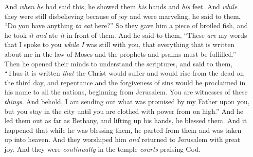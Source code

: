 \begin{biblechapter}
\verse And \textit{when he} had said this, he showed them \textit{his} hands and \textit{his} feet.
\verse And \textit{while} they were still disbelieving because of joy and were marveling, he said to them, “Do you have anything \textit{to eat} here?”
\verse So they gave him a piece of broiled fish,
\verse and he took \textit{it} \textit{and} ate \textit{it} in front of them.
 And he said to them, “These \textit{are} my words that I spoke to you \textit{while I} was still with you, that everything that is written about me in the law of Moses and the prophets and psalms must be fulfilled.”
\verse Then he opened their minds to understand the scriptures,
\verse and said to them, “Thus it is written \textit{that} the Christ would suffer and would rise from the dead on the third day,
\verse and repentance and the forgiveness of sins would be proclaimed in his name to all the nations, beginning from Jerusalem.
\verse You are witnesses of these \textit{things}.
\verse And behold, I am sending out what was promised by my Father upon you, but you stay in the city until you are clothed with power from on high.”
 And he led them out as far as Bethany, and lifting up his hands, he blessed them.
\verse And it happened that while he was blessing them, he parted from them and was taken up into heaven.
\verse And they worshiped him \textit{and} returned to Jerusalem with great joy.
\verse And they were \textit{continually} in the temple \textit{courts} praising God.
\end{biblechapter}


